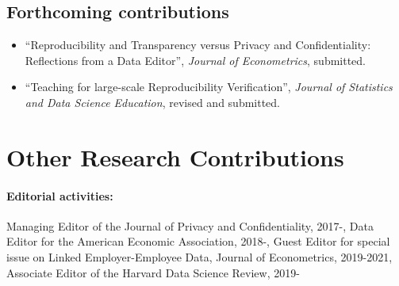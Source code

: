 \documentclass[12pt,letterpaper]{article}
\begin{document}
\subsection*{Forthcoming contributions}

\begin{itemize}
  \item ``Reproducibility and Transparency versus Privacy and Confidentiality: Reflections from a Data Editor'', \textit{Journal of Econometrics}, submitted.
  \item ``Teaching for large-scale Reproducibility Verification'', \textit{Journal of Statistics and Data Science Education}, revised and submitted.
\end{itemize}

\section{Other Research Contributions}


\paragraph{Editorial activities:\ }
 Managing Editor of the Journal of Privacy and Confidentiality, 2017-,
 Data Editor for the American Economic Association, 2018-,
Guest Editor for special issue on Linked Employer-Employee Data, Journal of Econometrics, 2019-2021,
	 Associate Editor of the Harvard Data Science Review, 2019-
\end{document}
